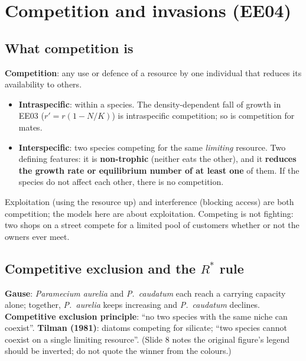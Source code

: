 \section{Competition and invasions (EE04)}

\subsection{What competition is}
\textbf{Competition}: any use or defence of a resource by one individual that reduces its availability to others.
\begin{itemize}
\item \textbf{Intraspecific}: within a species. The density-dependent fall of growth in EE03 ($r'=r(1-N/K)$) is
intraspecific competition; so is competition for mates.
\item \textbf{Interspecific}: two species competing for the same \emph{limiting} resource. Two defining features: it is
\textbf{non-trophic} (neither eats the other), and it \textbf{reduces the growth rate or equilibrium number of at
least one} of them. If the species do not affect each other, there is no competition.
\end{itemize}
Exploitation (using the resource up) and interference (blocking access) are both competition; the models here are
about exploitation. Competing is not fighting: two shops on a street compete for a limited pool of customers whether
or not the owners ever meet.

\subsection{Competitive exclusion and the $R^*$ rule}
\textbf{Gause}: \emph{Paramecium aurelia} and \emph{P.\ caudatum} each reach a carrying capacity alone; together,
\emph{P.\ aurelia} keeps increasing and \emph{P.\ caudatum} declines. \textbf{Competitive exclusion principle}: ``no
two species with the same niche can coexist''. \textbf{Tilman (1981)}: diatoms competing for silicate; ``two species
cannot coexist on a single limiting resource''. (Slide 8 notes the original figure's legend should be inverted; do
not quote the winner from the colours.)

